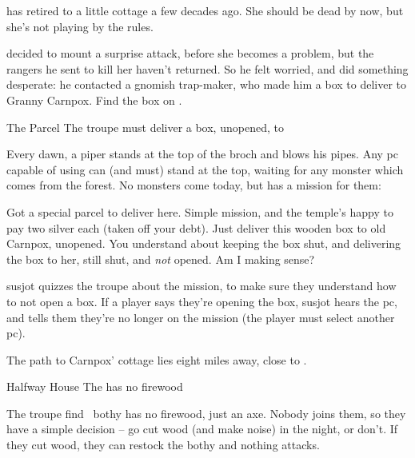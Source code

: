 \documentclass[10pt,twoside]{book}
\begin{document}


\vspace{-1em}



\noindent
{} has retired to a little cottage a few decades ago.
She should be dead by now, but she's not playing by the rules.

 decided to mount a surprise attack, before she becomes a problem, but the \glspl{ranger} he sent to kill her haven't returned.
So he felt worried, and did something desperate: he contacted a gnomish trap-maker, who made him a box to deliver to Granny Carnpox.
Find the box on .

{The Parcel}%
{The troupe must deliver a box, unopened, to }%

\pagestyle{minizine}%

Every dawn, a piper stands at the top of the \gls{broch} and blows his pipes.
Any \gls{pc} capable of using  can (and must) stand at the top, waiting for any \gls{monster} which comes from the forest.
No \glspl{monster} come today, but  has a mission for them:

\begin{speechtext}
  Got a special parcel to deliver here.
  Simple mission, and the temple's happy to pay two silver each (taken off your debt).
  Just deliver this wooden box to old Carnpox, unopened.
  You understand about keeping the box shut, and delivering the box to her, still shut, and \emph{not} opened.
  Am I making sense?
\end{speechtext}

\Gls{susjot} quizzes the troupe about the mission, to make sure they understand how to not open a box.
If a player says they're opening the box, \gls{susjot} hears the \gls{pc}, and tells them they're no longer on the mission
(the player must select another \gls{pc}).

The path to Carnpox' cottage lies eight miles away, close to .

{Halfway House}%
{The  has no firewood}%

The troupe find \composeHumanName~\gls{bothy} has no firewood, just an axe.
Nobody joins them, so they have a simple decision -- go cut wood (and make noise) in the night, or don't.
If they cut wood, they can restock the \gls{bothy} and nothing attacks.
\end{document}

